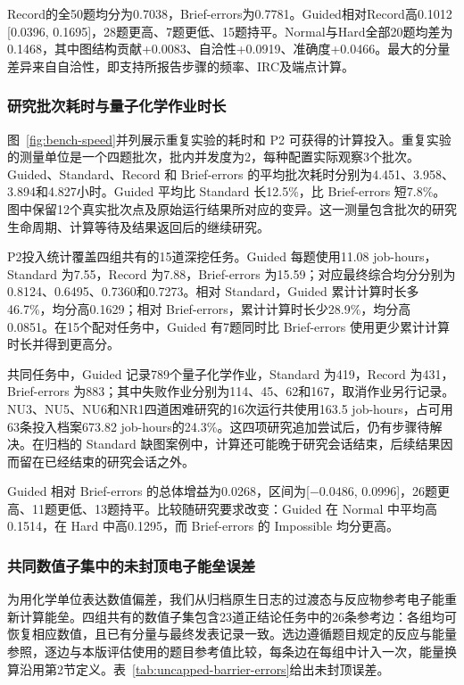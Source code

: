 Record的全50题均分为0.7038，Brief-errors为0.7781。Guided相对Record高0.1012 [0.0396, 0.1695]，28题更高、7题更低、15题持平。Normal与Hard全部20题均差为0.1468，其中图结构贡献+0.0083、自洽性+0.0919、准确度+0.0466。最大的分量差异来自自洽性，即支持所报告步骤的频率、IRC及端点计算。

\subsubsection{研究批次耗时与量子化学作业时长}

图~\ref{fig:bench-speed}并列展示重复实验的耗时和 P2 可获得的计算投入。重复实验的测量单位是一个四题批次，批内并发度为2，每种配置实际观察3个批次。Guided、Standard、Record 和 Brief-errors 的平均批次耗时分别为4.451、3.958、3.894和4.827小时。Guided 平均比 Standard 长12.5\%，比 Brief-errors 短7.8\%。图中保留12个真实批次点及原始运行结果所对应的变异。这一测量包含批次的研究生命周期、计算等待及结果返回后的继续研究。

P2投入统计覆盖四组共有的15道深挖任务。Guided 每题使用11.08 job-hours，Standard 为7.55，Record 为7.88，Brief-errors 为15.59；对应最终综合均分分别为0.8124、0.6495、0.7360和0.7273。相对 Standard，Guided 累计计算时长多46.7\%，均分高0.1629；相对 Brief-errors，累计计算时长少28.9\%，均分高0.0851。在15个配对任务中，Guided 有7题同时比 Brief-errors 使用更少累计计算时长并得到更高分。

共同任务中，Guided 记录789个量子化学作业，Standard 为419，Record 为431，Brief-errors 为883；其中失败作业分别为114、45、62和167，取消作业另行记录。NU3、NU5、NU6和NR1四道困难研究的16次运行共使用163.5 job-hours，占可用63条投入档案673.82 job-hours的24.3\%。这四项研究追加尝试后，仍有步骤待解决。在归档的 Standard 缺图案例中，计算还可能晚于研究会话结束，后续结果因而留在已经结束的研究会话之外。

Guided 相对 Brief-errors 的总体增益为0.0268，区间为[$-0.0486$, 0.0996]，26题更高、11题更低、13题持平。比较随研究要求改变：Guided 在 Normal 中平均高0.1514，在 Hard 中高0.1295，而 Brief-errors 的 Impossible 均分更高。

\subsubsection{共同数值子集中的未封顶电子能垒误差}

为用化学单位表达数值偏差，我们从归档原生日志的过渡态与反应物参考电子能重新计算能垒。四组共有的数值子集包含23道正结论任务中的26条参考边：各组均可恢复相应数值，且已有分量与最终发表记录一致。选边遵循题目规定的反应与能量参照，逐边与本版评估使用的题目参考值比较，每条边在每组中计入一次，能量换算沿用第2节定义。表~\ref{tab:uncapped-barrier-errors}给出未封顶误差。

